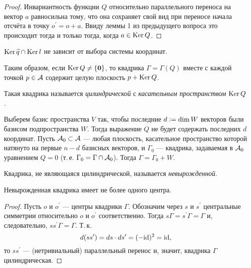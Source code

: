 \begin{proof}
    Инвариантность функции $Q$ относительно параллельного переноса на вектор $a$ равносильна тому, что она сохраняет свой вид при переносе начала отсчёта в точку $o^\prime = o + a$. Ввиду леммы 1 из предыдущего вопроса это происходит тогда и только тогда, когда $a \in \operatorname{Ker} Q$.
\end{proof}

\begin{corollary}
    $\operatorname{Ker} \widehat{q} \cap \operatorname{Ker} l$ не зависит от выбора системы координат.
\end{corollary}

Таким образом, если $\operatorname{Ker} Q \ne \{\boldsymbol{0}\}$, то квадрика $\Gamma = \Gamma(Q)$ вместе с каждой точкой $p \in \mathcal{A}$ содержит целую плоскость $p + \operatorname{Ker} Q$.

\begin{definition}
    Такая квадрика называется \textit{цилиндрической} с \textit{касательным пространством} $\operatorname{Ker} Q$.
\end{definition}

Выберем базис пространства $V$ так, чтобы последние $d \vcentcolon = \dim W$ векторов были базисом подпространства $W$. Тогда выражение $Q$ не будет содержать последних $d$ координат. Пусть $\mathcal{A}_0 \subset \mathcal{A}$ --- любая плоскость, касательное пространство которой натянуто на первые $n - d$ базисных векторов, и $\Gamma_0$ --- квадрика, задаваемая в $\mathcal{A}_0$ уравнением $Q = 0$ (т.\,е. $\Gamma_0 = \Gamma \cap \mathcal{A}_0$). Тогда $\Gamma = \Gamma_0 + W$.

\begin{definition}
    Квадрика, не являющаяся цилиндрической, называется \textit{невырожденной}.
\end{definition}

\begin{proposal}
    Невырожденная квадрика имеет не более одного центра.
\end{proposal}

\begin{proof}
    Пусть $o$ и $o^\prime$ --- центры квадрики $\Gamma$. Обозначим через $s$ и $s^\prime$ центральные симметрии относительно $o$ и $o^\prime$ соответственно. Тогда $s\Gamma = s^\prime\Gamma = \Gamma$ и, следовательно, $ss^\prime \Gamma = \Gamma$. Т.\,к.
    \[
        d(ss^\prime) = ds \cdot ds^\prime = (-\mathrm{id})^2 = \mathrm{id},
    \]
    то $ss^\prime$ --- (нетривиальный) параллельный перенос и, значит, квадрика $\Gamma$ цилиндрическая.
\end{proof}

